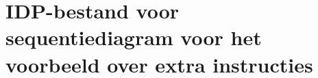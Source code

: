 
\chapter{IDP-bestand voor sequentiediagram voor het voorbeeld over extra instructies}\label{app:new-nim}

\label{code:new-nim}


%
%

%
%